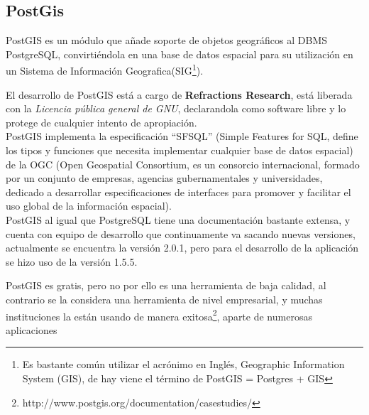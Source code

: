 

    \subsection{PostGis} %
    \label{sec:postgis}

      PostGIS es un módulo  que a\~nade soporte de objetos geográficos al DBMS PostgreSQL, convirtiéndola en una base de datos espacial para su utilización en un Sistema de Informaci\'on Geografica(SIG\footnote{ Es bastante común utilizar el acrónimo en Inglés, Geographic Information System (GIS), de hay viene el término de PostGIS = Postgres + GIS}).

      El desarrollo de PostGIS está a cargo de \textbf{Refractions Research}, está liberada con la \emph{Licencia pública general de GNU}, declarandola como software libre y lo protege de cualquier intento de apropiaci\'on.\\

      PostGIS implementa la especificaci\'on ``SFSQL'' (Simple Features for SQL, define los tipos y funciones que necesita implementar cualquier base de datos espacial) de la OGC (Open Geospatial Consortium, es un consorcio internacional, formado por un conjunto de empresas, agencias gubernamentales y universidades, dedicado a desarrollar especificaciones de interfaces para promover y facilitar el uso global de la información espacial).\\

      PostGIS al igual que PostgreSQL tiene una documentaci\'on bastante extensa, y cuenta con equipo de desarrollo que continuamente va sacando nuevas versiones, actualmente se encuentra la versi\'on 2.0.1, pero para el desarrollo de la aplicaci\'on se hizo uso de la versi\'on 1.5.5.

      PostGIS es gratis, pero no por ello es una herramienta de baja calidad, al contrario se la considera una herramienta de nivel empresarial, y muchas instituciones la est\'an usando de manera exitosa\footnote{ http://www.postgis.org/documentation/casestudies/}, aparte de numerosas aplicaciones \\

